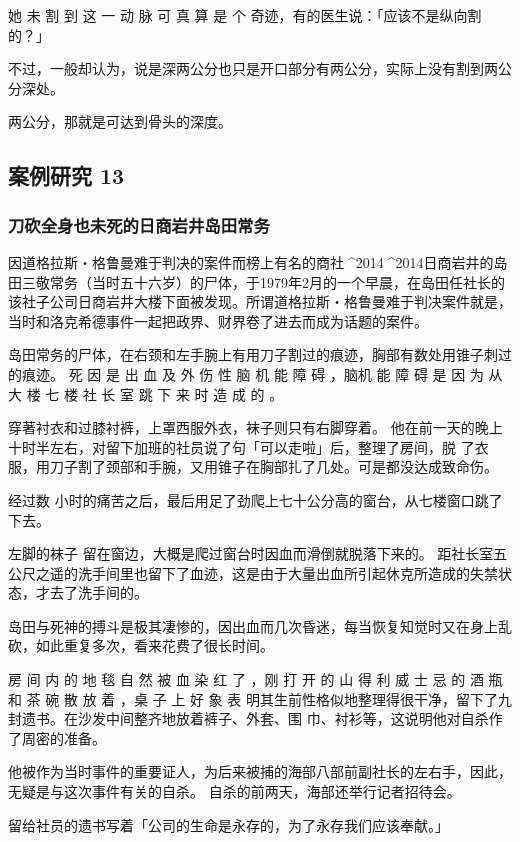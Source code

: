 \documentclass[UTF8]{ctexart}
\begin{document}
她 未 割 到 这 一 动 脉 可 真 算 是 个 奇迹，有的医生说：「应该不是纵向割的？」

不过，一般却认为，说是深两公分也只是开口部分有两公分，实际上没有割到两公分深处。

两公分，那就是可达到骨头的深度。

\subsection{案例研究 13}
\subsubsection*{刀砍全身也未死的日商岩井岛田常务}

因道格拉斯‧格鲁曼难于判决的案件而榜上有名的商社^^^^2014^^^^2014日商岩井的岛田三敬常务（当时五十六岁）的尸体，于1979年2月的一个早晨，在岛田任社长的该社子公司日商岩井大楼下面被发现。所谓道格拉斯‧格鲁曼难于判决案件就是，当时和洛克希德事件一起把政界、财界卷了进去而成为话题的案件。

岛田常务的尸体，在右颈和左手腕上有用刀子割过的痕迹，胸部有数处用锥子刺过的痕迹。 
死 因 是 出 血 及 外 伤 性 脑 机 能 障 碍 ，脑机 能 障 碍 是 因 为 从 大 楼 七 楼 社 长 室 跳 下 来 时 造 成 的 。

穿著衬衣和过膝衬裤，上罩西服外衣，袜子则只有右脚穿着。 
他在前一天的晚上十时半左右，对留下加班的社员说了句「可以走啦」后，整理了房间，脱 了衣服，用刀子割了颈部和手腕，又用锥子在胸部扎了几处。可是都没达成致命伤。

经过数 小时的痛苦之后，最后用足了劲爬上七十公分高的窗台，从七楼窗口跳了下去。

左脚的袜子 留在窗边，大概是爬过窗台时因血而滑倒就脱落下来的。 
距社长室五公尺之遥的洗手间里也留下了血迹，这是由于大量出血所引起休克所造成的失禁状态，才去了洗手间的。

岛田与死神的搏斗是极其凄惨的，因出血而几次昏迷，每当恢复知觉时又在身上乱砍，如此重复多次，看来花费了很长时间。

房 间 内 的 地 毯 自 然 被 血 染 红 了 ，刚 打 开 的 山 得 利 威 士 忌 的 酒 瓶 和 茶 碗 散 放 着 ，桌 子 上 好 象 表 明其生前性格似地整理得很干净，留下了九封遗书。在沙发中间整齐地放着裤子、外套、围 巾、衬衫等，这说明他对自杀作了周密的准备。

他被作为当时事件的重要证人，为后来被捕的海部八部前副社长的左右手，因此，无疑是与这次事件有关的自杀。
自杀的前两天，海部还举行记者招待会。

留给社员的遗书写着「公司的生命是永存的，为了永存我们应该奉献。」
\end{document}
